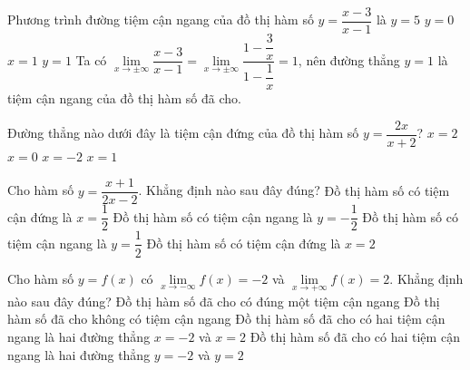 \boxde
\BTTN
\begin{ex}%
    Phương trình đường tiệm cận ngang của đồ thị hàm số $y=\dfrac{x-3}{x-1}$ là
    \choice
    {$y=5$}
    {$y=0$}
    {$x=1$}
    {\True $y=1$}
    \loigiai
    {
        Ta có $\lim\limits_{x \to \pm \infty}\dfrac{x-3}{x-1} = \lim\limits_{x \to \pm \infty}\dfrac{1-\dfrac{3}{x}}{1-\dfrac{1}{x}}=1$, nên đường thẳng $y=1$ là tiệm cận ngang của đồ thị hàm số đã cho.
    }
\end{ex}


\begin{ex}
    Đường thẳng nào dưới đây là tiệm cận đứng của đồ thị hàm số $y=\dfrac{2x}{x+2}$?
    \choice
    {$x=2$}
    {$x=0$}
    {\True $x=-2$}
    {$x=1$}
\end{ex}

\begin{ex}%
    Cho hàm số $y=\dfrac{x+1}{2x-2}$. Khẳng định nào sau đây đúng?
    \choice
    {Đồ thị hàm số có tiệm cận đứng là $x=\dfrac{1}{2}$}
    {Đồ thị hàm số có tiệm cận ngang là $y=-\dfrac{1}{2}$}
    {\True Đồ thị hàm số có tiệm cận ngang là $y=\dfrac{1}{2}$}
    {Đồ thị hàm số có tiệm cận đứng là $x=2$}
\end{ex}


\begin{ex}%
    Cho hàm số $y=f(x)$ có $\lim\limits_{x\to -\infty} f(x)= -2$ và $\lim\limits_{x\to +\infty} f(x)= 2$. Khẳng định nào sau đây đúng?
    \choice
    {Đồ thị hàm số đã cho có đúng một tiệm cận ngang}
    {Đồ thị hàm số đã cho không có tiệm cận ngang}
    {Đồ thị hàm số đã cho có hai tiệm cận ngang là hai đường thẳng $x=-2$ và $x=2$}
    {\True Đồ thị hàm số đã cho có hai tiệm cận ngang là hai đường thẳng $y=-2$ và $y=2$}
\end{ex}

